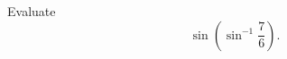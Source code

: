 \documentclass{ximera}
\author{Nela Lakos \and Kyle Parsons}
\begin{document}
\begin{exercise}

Evaluate
\[
\sin\left(\sin^{-1}\frac{7}{6}\right).
\]

\begin{multipleChoice}
\end{multipleChoice}

\end{exercise}
\end{document}

